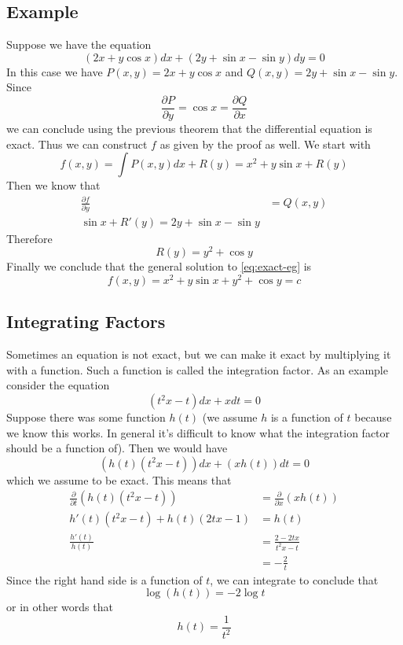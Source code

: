 \subsection{Example}
Suppose we have the equation
\begin{equation}\label{eq:exact-eg}
    (2x + y \cos x)dx + (2y + \sin x - \sin y)dy = 0
\end{equation}
In this case we have $P(x, y) = 2x + y \cos x$ and $Q(x, y) = 2y + \sin x - \sin y$. Since
$$ \frac{\partial P}{\partial y} = \cos x = \frac{\partial Q}{\partial x} $$
we can conclude using the previous theorem that the differential equation is exact. Thus we can construct $f$ as given by the proof as well. We start with
$$ f(x, y) = \int P(x, y) dx + R(y) = x^2 + y \sin x + R(y) $$
Then we know that
\begin{align*}
    \frac{\partial f}{\partial y} &= Q(x, y)\\
    \sin x + R'(y) = 2y + \sin x - \sin y
\end{align*}
Therefore
$$R(y) = y^2 + \cos y$$
Finally we conclude that the general solution to \autoref{eq:exact-eg} is 
$$ f(x, y) = x^2 + y \sin x + y^2 + \cos y = c $$

\subsection{Integrating Factors}
Sometimes an equation is not exact, but we can make it exact by multiplying it with a function. Such a function is called the integration factor. As an example consider the equation
\begin{equation}
    (t^2 x - t) dx + x dt = 0
\end{equation}
Suppose there was some function $h(t)$ (we assume $h$ is a function of $t$ because we know this works. In general it's difficult to know what the integration factor should be a function of). Then we would have
$$ (h(t)(t^2 x - t))dx + (x h(t)) dt = 0 $$
which we assume to be exact. This means that
\begin{align*}
    \frac{\partial }{\partial t} (h(t)(t^2 x - t)) &= \frac{\partial}{\partial x} (x h(t))\\
    h'(t) (t^2 x - t) + h(t) (2tx - 1) &= h(t)\\
    \frac{h'(t)}{h(t)} &= \frac{2 - 2tx}{t^2 x - t} \\
    &= -\frac{2}{t}
\end{align*}
Since the right hand side is a function of $t$, we can integrate to conclude that
$$ \log(h(t)) = -2 \log t $$
or in other words that
$$ h(t) = \frac{1}{t^2} $$

